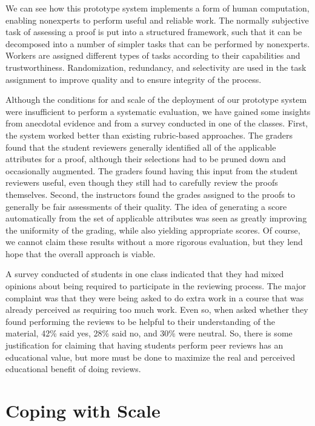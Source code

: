 \documentclass[12pt]{article}
\begin{document}
We can see how this prototype system implements a form of human computation,
enabling nonexperts to perform useful and reliable work.  The normally
subjective task of assessing a proof is put into a structured
framework, such that it can be decomposed into a number of simpler
tasks that can be performed by nonexperts.  Workers are assigned
different types of tasks according to their capabilities and trustworthiness.
Randomization, redundancy, and selectivity are used in the task assignment to
improve quality and to ensure integrity of the process.

Although the conditions for and scale of the deployment of our
prototype system were insufficient to perform a systematic evaluation,
we have gained some insights from anecdotal evidence and from a survey
conducted in one of the classes.  First, the system worked better than existing
rubric-based approaches.
The graders found that the student
reviewers generally identified all of the applicable attributes for a
proof, although their selections had to be pruned down and
occasionally augmented.  The graders found having this input from the
student reviewers useful, even though they still had to carefully
review the proofs themselves.  Second, the instructors found the
grades assigned to the proofs to generally be fair assessments of
their quality.  The idea of generating a score automatically from the
set of applicable attributes was seen as greatly improving the
uniformity of the grading, while also yielding appropriate scores.
Of course, we cannot claim these results without a more rigorous
evaluation, but they lend hope that the overall approach is viable.

A survey conducted of students in one class indicated that they had
mixed opinions about being required to participate in the reviewing
process.  The major complaint was that they were being asked to do
extra work in a course that was already perceived as requiring too much
work.  Even so, when asked whether they found performing the reviews
to be helpful to their understanding of the material, 42\% said yes,
28\% said no, and 30\% were neutral.  So, there is some justification
for claiming that having students perform peer reviews has an educational
value, but more must be done to maximize the real and perceived
educational benefit of doing reviews.

\section{Coping with Scale}
\end{document}
